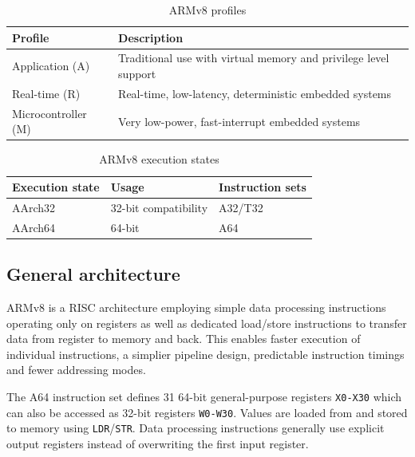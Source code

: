 \begin{table}[h!]
    \centering
    \begin{tabularx}{\textwidth}{lX}
        \toprule
        Profile & Description \\
        \midrule
        Application (A) & Traditional use with virtual memory and privilege level support \\
        Real-time (R) & Real-time, low-latency, deterministic embedded systems \\
        Microcontroller (M) & Very low-power, fast-interrupt embedded systems \\
        \bottomrule
    \end{tabularx}
    \caption{ARMv8 profiles}
\end{table}

\begin{table}[h!]
    \centering
    \begin{tabularx}{\textwidth}{llX}
        \toprule
        Execution state & Usage & Instruction sets \\
        \midrule
        AArch32 & 32-bit compatibility & A32/T32 \\
        AArch64 & 64-bit & A64 \\
        \bottomrule
    \end{tabularx}
    \caption{ARMv8 execution states}
\end{table}

\subsection{General architecture}

ARMv8 is a RISC architecture employing simple data processing instructions
operating only on registers as well as dedicated load/store instructions to
transfer data from register to memory and back. This enables faster execution
of individual instructions, a simplier pipeline design, predictable instruction
timings and fewer addressing modes.

The A64 instruction set defines 31 64-bit general-purpose registers
\texttt{X0-X30} which can also be accessed as 32-bit registers \texttt{W0-W30}.
Values are loaded from and stored to memory using \texttt{LDR}/\texttt{STR}.
Data processing instructions generally use explicit output registers instead of
overwriting the first input register.

